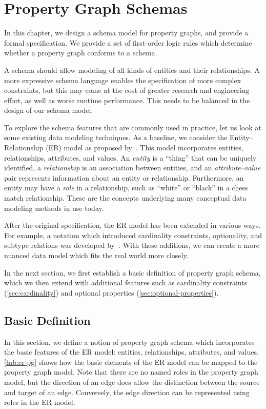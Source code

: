 \documentclass{report}
\theoremstyle{definition}
\begin{document}
\chapter{Property Graph Schemas}
\label{ch:pg-schema}

In this chapter, we design a schema model for property graphs, and provide a formal specification. We provide a set of first-order logic rules which determine whether a property graph conforms to a schema.

A schema should allow modeling of all kinds of entities and their relationships. A more expressive schema language enables the specification of more complex constraints, but this may come at the cost of greater research and engineering effort, as well as worse runtime performance. This needs to be balanced in the design of our schema model.

To explore the schema features that are commonly used in practice, let us look at some existing data modeling techniques. As a baseline, we consider the Entity--Relationship (ER) model as proposed by~\citet{chen1976entity}. This model incorporates entities, relationships, attributes, and values. An \emph{entity} is a ``thing'' that can be uniquely identified, a \emph{relationship} is an association between entities, and an \emph{attribute--value} pair represents information about an entity or relationship. Furthermore, an entity may have a \emph{role} in a relationship, such as ``white'' or ``black'' in a chess match relationship. These are the concepts underlying many conceptual data modeling methods in use today.

After the original specification, the ER model has been extended in various ways. For example, a notation which introduced cardinality constraints, optionality, and subtype relations was developed by~\citet{barker1990entity}. With these additions, we can create a more nuanced data model which fits the real world more closely.

In the next section, we first establish a basic definition of property graph schema, which we then extend with additional features such as cardinality constraints (\autoref{sec:cardinality}) and optional properties (\autoref{sec:optional-properties}).

\section{Basic Definition}

In this section, we define a notion of property graph schema which incorporates the basic features of the ER model: entities, relationships, attributes, and values. \autoref{tab:er-pg} shows how the basic elements of the ER model can be mapped to the property graph model. Note that there are no named roles in the property graph model, but the direction of an edge does allow the distinction between the source and target of an edge. Conversely, the edge direction can be represented using roles in the ER model.
\end{document}

